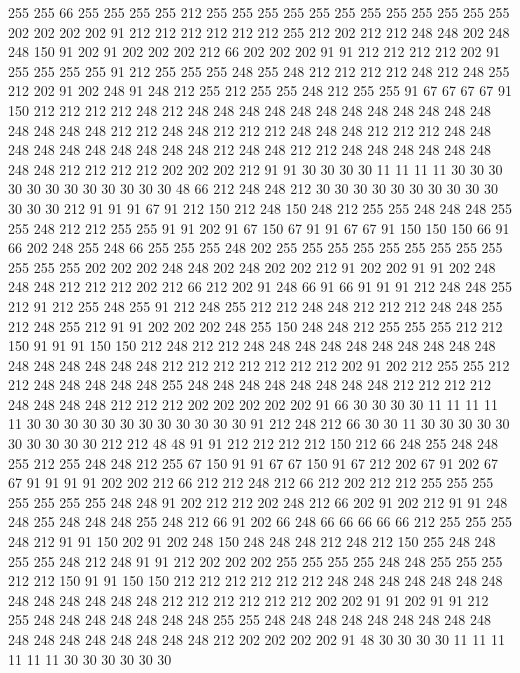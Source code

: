 255 255 66 255 255 255 255 212 255 255 255 255 255 255 255 255 255 255 255 255
202 202 202 202 91 212 212 212 212 212 212 255 212 202 212 212 248 248 202 248
248 150 91 202 91 202 202 202 212 66 202 202 202 91 91 212 212 212 212 202
91 255 255 255 255 91 212 255 255 255 248 255 248 212 212 212 212 248 212 248
255 212 202 91 202 248 91 248 212 255 212 255 255 248 212 255 255 91 67 67
67 67 91 150 212 212 212 212 248 212 248 248 248 248 248 248 248 248 248 248
248 248 248 248 248 248 212 212 248 248 212 212 212 248 248 248 212 212 212 248
248 248 248 248 248 248 248 248 248 212 248 248 212 212 248 248 248 248 248 248
248 248 212 212 212 212 202 202 202 212 91 91 30 30 30 30 11 11 11 11
30 30 30 30 30 30 30 30 30 30 30 30 48 66 212 248 248 212 30 30
30 30 30 30 30 30 30 30 30 30 30 212 91 91 91 67 91 212 150 212
248 150 248 212 255 255 248 248 248 255 255 248 212 212 255 255 91 91 202 91
67 150 67 91 91 67 67 91 150 150 150 66 91 66 202 248 255 248 66 255
255 255 248 202 255 255 255 255 255 255 255 255 255 255 255 255 202 202 202 248
248 202 248 202 202 212 91 202 202 91 91 202 248 248 248 212 212 212 202 212
66 212 202 91 248 66 91 66 91 91 91 212 248 248 255 212 91 212 255 248
255 91 212 248 255 212 212 248 248 212 212 212 248 248 255 212 248 255 212 91
91 202 202 202 248 255 150 248 248 212 255 255 255 212 212 150 91 91 91 150
150 212 248 212 212 248 248 248 248 248 248 248 248 248 248 248 248 248 248 248
248 212 212 212 212 212 212 212 202 91 202 212 255 255 212 212 248 248 248 248
248 255 248 248 248 248 248 248 248 248 212 212 212 212 248 248 248 248 212 212
212 202 202 202 202 202 91 66 30 30 30 30 11 11 11 11 11 30 30 30
30 30 30 30 30 30 30 30 30 91 212 248 212 66 30 30 11 30 30 30
30 30 30 30 30 30 30 212 212 48 48 91 91 212 212 212 212 150 212 66
248 255 248 248 255 212 255 248 248 212 255 67 150 91 91 67 67 150 91 67
212 202 67 91 202 67 67 91 91 91 91 202 202 212 66 212 212 248 212 66
212 202 212 212 255 255 255 255 255 255 255 248 248 91 202 212 212 202 248 212
66 202 91 202 212 91 91 248 248 255 248 248 248 255 248 212 66 91 202 66
248 66 66 66 66 66 212 255 255 255 248 212 91 91 150 202 91 202 248 150
248 248 248 212 248 212 150 255 248 248 255 255 248 212 248 91 91 212 202 202
202 255 255 255 255 248 248 255 255 255 212 212 150 91 91 150 150 212 212 212
212 212 212 248 248 248 248 248 248 248 248 248 248 248 248 248 212 212 212 212
212 212 202 202 91 91 202 91 91 212 255 248 248 248 248 248 248 248 255 255
248 248 248 248 248 248 248 248 248 248 248 248 248 248 248 248 248 212 202 202
202 202 91 48 30 30 30 30 11 11 11 11 11 11 30 30 30 30 30 30
